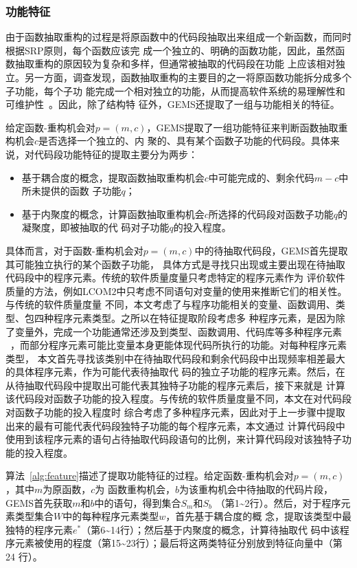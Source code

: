 \subsubsection{功能特征}

由于函数抽取重构的过程是将原函数中的代码段抽取出来组成一个新函数，而同时根据SRP原则，每个函数应该完
成一个独立的、明确的函数功能，因此，虽然函数抽取重构的原因较为复杂和多样，但通常被抽取的代码段在功能
上应该相对独立。另一方面，调查发现，函数抽取重构的主要目的之一将原函数功能拆分成多个子功能，每个子功
能完成一个相对独立的功能，从而提高软件系统的易理解性和可维护性~\cite{silva2016we}。因此，除了结构特
征外，GEMS还提取了一组与功能相关的特征。

给定函数-重构机会对$p=(m,c)$，GEMS提取了一组功能特征来判断函数抽取重构机会$c$是否选择一个独立的、内
聚的、具有某个函数子功能的代码段。具体来说，对代码段功能特征的提取主要分为两步：
\begin{itemize}
  \item 基于耦合度的概念，提取函数抽取重构机会$c$中可能完成的、剩余代码$m-c$中所未提供的函数
  子功能$q$；
  \item 基于内聚度的概念，计算函数抽取重构机会$c$所选择的代码段对函数子功能$q$的凝聚度，即被抽取的代
  码对子功能$q$的投入程度。
\end{itemize}

具体而言，对于函数-重构机会对$p=(m,c)$中的待抽取代码段，GEMS首先提取其可能独立执行的某个函数子功能，
具体方式是寻找只出现或主要出现在待抽取代码段中的程序元素。传统的软件质量度量只考虑特定的程序元素作为
评价软件质量的方法，例如LCOM$2$中只考虑不同语句对变量的使用来推断它们的相关性。与传统的软件质量度量
不同，本文考虑了与程序功能相关的变量、函数调用、类型、包四种程序元素类型。之所以在特征提取阶段考虑多
种程序元素，是因为除了变量外，完成一个功能通常还涉及到类型、函数调用、代码库等多种程序元素
~\cite{martin2003agile}，而部分程序元素可能比变量本身更能体现代码所执行的功能。对每种程序元素类型，
本文首先寻找该类别中在待抽取代码段和剩余代码段中出现频率相差最大的具体程序元素，作为可能代表待抽取代
码的独立子功能的程序元素。然后，在从待抽取代码段中提取出可能代表其独特子功能的程序元素后，接下来就是
计算该代码段对函数子功能的投入程度。与传统的软件质量度量不同，本文在对代码段对函数子功能的投入程度时
综合考虑了多种程序元素，因此对于上一步骤中提取出来的最有可能代表代码段独特子功能的每个程序元素，本文通过
计算代码段中使用到该程序元素的语句占待抽取代码段语句的比例，来计算代码段对该独特子功能的投入程度。

算法~\ref{alg:feature}描述了提取功能特征的过程。给定函数-重构机会对$p=(m,c)$，其中$m$为原函数，$c$为
函数重构机会，$b$为该重构机会中待抽取的代码片段，GEMS首先获取$m$和$b$中的语句，得到集合$S_m$和$S_b$
（第1\textasciitilde2行）。然后，对于程序元素类型集合$W$中的每种程序元素类型$w$，首先基于耦合度的概
念，提取该类型中最独特的程序元素$e^*$（第6\textasciitilde14行）；然后基于内聚度的概念，计算待抽取代
码中该程序元素被使用的程度（第15\textasciitilde23行）；最后将这两类特征分别放到特征向量中（第24
行）。

